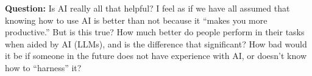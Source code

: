 \textbf{Question:}
Is AI really all that helpful?
I feel as if we have all assumed that knowing how to use AI is better than not because it ``makes you more productive.''
But is this true?
How much better do people perform in their tasks when aided by AI (LLMs), and is the difference that significant?
How bad would it be if someone in the future does not have experience with AI, or doesn't know how to ``harness'' it?